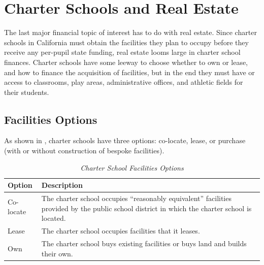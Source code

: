 \section{Charter Schools and Real Estate}\label{sec:real-estate}\indent%

The last major financial topic of interest has to do with real estate. Since charter schools in California must obtain the facilities they plan to occupy before they receive any per-pupil state funding, real estate looms large in charter school finances. Charter schools have some leeway to choose whether to own or lease, and how to finance the acquisition of facilities, but in the end they must have or access to classrooms, play areas, administrative offices, and athletic fields for their students.

\subsection{Facilities Options}\label{sec:facilities-options}\indent%

As shown in , charter schools have three options: co-locate, lease, or purchase (with or without construction of bespoke facilities).

\begin{table}[ht]
  \small%
  \caption[Charter School Facilities Options]{\textit{Charter School Facilities Options}}\label{tab:charter-facilities-options}%
  \begin{tabular}{ll}
    \toprule%
    Option    & Description \\
    \midrule%
    Co-locate & \multirow[t]{2}{4.75in}{The charter school occupies ``reasonably equivalent'' facilities provided by 
                the public school district in which the charter school is located.}\\
                \\
    Lease     & The charter school occupies facilities that it leases.\\
    Own       & The charter school buys existing facilities or buys land and builds their own. \\
    \bottomrule%
  \end{tabular}
\end{table}

